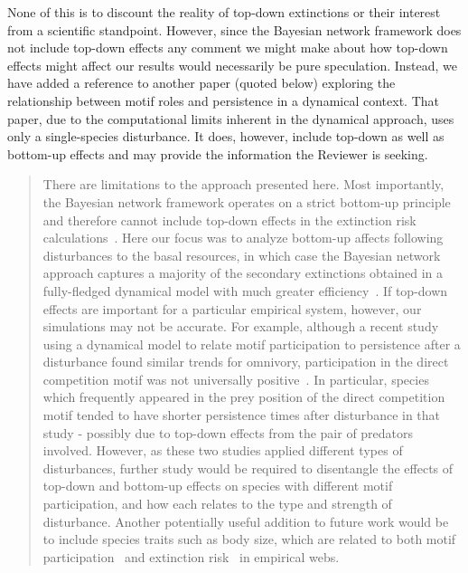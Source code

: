 \documentclass[12pt]{article}
\begin{document}
\begin{enumerate}
                None of this is to discount the reality of top-down extinctions or their interest from a scientific standpoint. However, since the Bayesian network framework does not include top-down effects any comment we might make about how top-down effects might affect our results would necessarily be pure speculation. Instead, we have added a reference to another paper (quoted below) exploring the relationship between motif roles and persistence in a dynamical context. That paper, due to the computational limits inherent in the dynamical approach, uses only a single-species disturbance. It does, however, include top-down as well as bottom-up effects and may provide the information the Reviewer is seeking.


                \begin{quotation}
    There are limitations to the approach presented here.
    Most importantly, the Bayesian network framework operates on a strict bottom-up principle and therefore cannot include top-down effects in the extinction risk calculations~\citep{Eklof2013}. 
    Here our focus was to analyze bottom-up affects following disturbances to the basal resources, in which case the Bayesian network approach captures a majority of the secondary extinctions obtained in a fully-fledged dynamical model with much greater efficiency~\citep{Eklof2013}.
    If top-down effects are important for a particular empirical system, however, our simulations may not be accurate. 
    For example, although a recent study using a dynamical model to relate motif participation to persistence after a disturbance found similar trends for omnivory, participation in the direct competition motif was not universally positive~\citep{Cirtwill2022Oikos}.
    In particular, species which frequently appeared in the prey position of the direct competition motif tended to have shorter persistence times after disturbance in that study - possibly due to top-down effects from the pair of predators involved.
    However, as these two studies applied different types of disturbances, further study would be required to disentangle the effects of top-down and bottom-up effects on species with different motif participation, and how each relates to the type and strength of disturbance.
    Another potentially useful addition to future work would be to include species traits such as body size, which are related to both motif participation~\citep{cirtwill2018feeding} and extinction risk~\citep{Brose2017,Cardillo2005,Purvis2000} in empirical webs.

                \end{quotation}



\end{enumerate}
\end{document}
